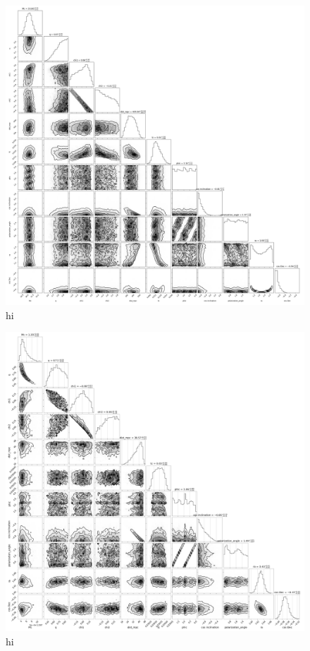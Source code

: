 \documentclass[twocolumn]{aastex631}
\begin{document}
\begin{figure}
\includegraphics[width=0.99\linewidth]{static/GW150914.png}
\caption{
    hi
}
\label{fig:GW150914}
\end{figure}

\begin{figure}
\includegraphics[width=0.99\linewidth]{static/GW170817.png}
\caption{
    hi
}
\label{fig:GW170817}
\end{figure}
\end{document}
